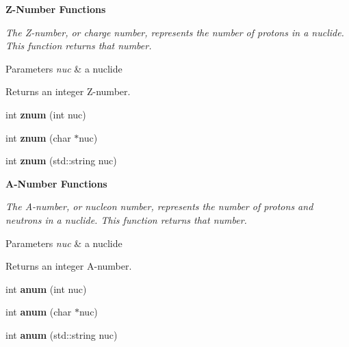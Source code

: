\begin{Indent}{\bf Z-\/\-Number Functions}\par
{\em The Z-\/number, or charge number, represents the number of protons in a nuclide. This function returns that number. 
\begin{DoxyParams}{Parameters}
{\em nuc} & a nuclide \\
\hline
\end{DoxyParams}
\begin{DoxyReturn}{Returns}
an integer Z-\/number. 
\end{DoxyReturn}
}\begin{DoxyCompactItemize}
\item 
\hypertarget{namespacepyne_1_1nucname_a2c04523f8462b5904458efa27433d159}{int {\bfseries znum} (int nuc)}\label{namespacepyne_1_1nucname_a2c04523f8462b5904458efa27433d159}

\item 
\hypertarget{namespacepyne_1_1nucname_a1cc8fb73700e54f2a3a0fab69f3232d2}{int {\bfseries znum} (char $\ast$nuc)}\label{namespacepyne_1_1nucname_a1cc8fb73700e54f2a3a0fab69f3232d2}

\item 
\hypertarget{namespacepyne_1_1nucname_a2af22abe099e287b32b869262eef1b21}{int {\bfseries znum} (std\-::string nuc)}\label{namespacepyne_1_1nucname_a2af22abe099e287b32b869262eef1b21}

\end{DoxyCompactItemize}
\end{Indent}
\begin{Indent}{\bf A-\/\-Number Functions}\par
{\em The A-\/number, or nucleon number, represents the number of protons and neutrons in a nuclide. This function returns that number. 
\begin{DoxyParams}{Parameters}
{\em nuc} & a nuclide \\
\hline
\end{DoxyParams}
\begin{DoxyReturn}{Returns}
an integer A-\/number. 
\end{DoxyReturn}
}\begin{DoxyCompactItemize}
\item 
\hypertarget{namespacepyne_1_1nucname_a64059037d5c5928c3f736754b8f20f10}{int {\bfseries anum} (int nuc)}\label{namespacepyne_1_1nucname_a64059037d5c5928c3f736754b8f20f10}

\item 
\hypertarget{namespacepyne_1_1nucname_a6de8bf427cb97677af4db50a8af7a4c7}{int {\bfseries anum} (char $\ast$nuc)}\label{namespacepyne_1_1nucname_a6de8bf427cb97677af4db50a8af7a4c7}

\item 
\hypertarget{namespacepyne_1_1nucname_ac1fa1ad42620cc2f337f8b836508185e}{int {\bfseries anum} (std\-::string nuc)}\label{namespacepyne_1_1nucname_ac1fa1ad42620cc2f337f8b836508185e}

\end{DoxyCompactItemize}
\end{Indent}
